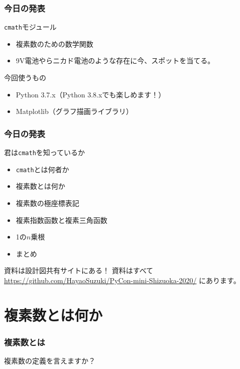 \documentclass[dvipdfmx,11pt,notheorems]{beamer}
\theoremstyle{definition}
\begin{document}
\begin{frame}\frametitle{今日の発表}

\begin{block}{\texttt{cmath}モジュール}
\begin{itemize}
\item 複素数のための数学関数
\item 9V電池やらニカド電池のような存在に今、スポットを当てる。
\end{itemize}
\end{block}

\begin{block}{今回使うもの}
\begin{itemize}
\item Python 3.7.x（Python 3.8.xでも楽しめます！）
\item Matplotlib（グラフ描画ライブラリ）
\end{itemize}
\end{block}

\end{frame}

\begin{frame}\frametitle{今日の発表}

\begin{block}{君は\texttt{cmath}を知っているか}
\begin{itemize}
\item \texttt{cmath}とは何者か
\item 複素数とは何か
\item 複素数の極座標表記
\item 複素指数函数と複素三角函数
\item 1の$n$乗根
\item まとめ
\end{itemize}
\end{block}

\begin{exampleblock}{資料は設計図共有サイトにある！}
資料はすべて
\url{https://github.com/HayaoSuzuki/PyCon-mini-Shizuoka-2020/}
にあります。
\end{exampleblock}

\end{frame}

\section{複素数とは何か}

\begin{frame}\frametitle{複素数とは}

\begin{center}
\Huge{複素数の定義を言えますか？}
\end{center}

\end{frame}
\end{document}
